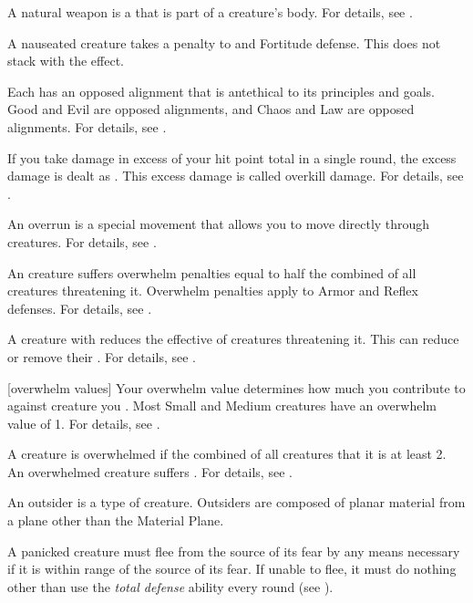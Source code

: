  A natural weapon is a  that is part of a creature's body.
For details, see .

 A nauseated creature takes a  penalty to  and Fortitude defense.
This does not stack with the  effect.

 Each  has an opposed alignment that is antethical to its principles and goals.
Good and Evil are opposed alignments, and Chaos and Law are opposed alignments.
For details, see .

 If you take damage in excess of your  hit point total in a single round, the excess damage is dealt as .
This excess damage is called overkill damage.
For details, see .

 An overrun is a special movement that allows you to move directly through creatures.
For details, see .

 An  creature suffers overwhelm penalties equal to half the combined  of all creatures threatening it.
Overwhelm penalties apply to Armor and Reflex defenses.
For details, see .

 A creature with  reduces the effective  of creatures threatening it.
This can reduce or remove their .
For details, see .

[overwhelm values] Your overwhelm value determines how much you contribute to  against creature you .
Most Small and Medium creatures have an overwhelm value of 1.
For details, see .

 A creature is overwhelmed if the combined  of all creatures that  it is at least 2.
An overwhelmed creature suffers .
For details, see .

 An outsider is a type of creature.
Outsiders are composed of planar material from a plane other than the Material Plane.

 A panicked creature must flee from the source of its fear by any means necessary if it is within \rngmed range of the source of its fear.
If unable to flee, it must do nothing other than use the \textit{total defense} ability every round (see ).

